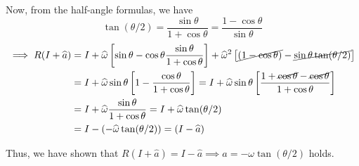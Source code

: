 Now, from the half-angle formulas, we have
\begin{equation*}
    \tan (\theta / 2)
    =
    \frac{\sin \theta}{1 + \cos \theta}
    =
    \frac{1 - \cos \theta}{\sin \theta}
\end{equation*}
\begin{align*}
    \implies
    R(I + \widehat{a})
     & =
    I + \widehat{\omega} \left[ \sin \theta - \cos \theta \frac{\sin \theta}{1 + \cos \theta} \right] + \widehat{\omega}^{2} \left[\cancel{(1 - \cos \theta)} - \cancel{\sin \theta \tan(\theta / 2)} \right]
    \\ & =
    I + \widehat{\omega} \sin \theta \left[ 1 - \frac{\cos \theta}{1 + \cos \theta} \right]
    =
    I + \widehat{\omega} \sin \theta \left[ \frac{1 + \cancel{\cos \theta} - \cancel{\cos \theta}}{1 + \cos \theta} \right]
    \\ & =
    I + \widehat{\omega} \frac{\sin \theta}{1 + \cos \theta}
    =
    I + \widehat{\omega} \tan(\theta / 2)
    \\ & =
    I - (-\widehat{\omega} \tan(\theta / 2))
    =
    (I - \widehat{a})
\end{align*}

Thus, we have shown that \( R(I + \widehat{a}) = I - \widehat{a} \implies \boxed{a = -\omega \tan(\theta / 2)} \) holds.
